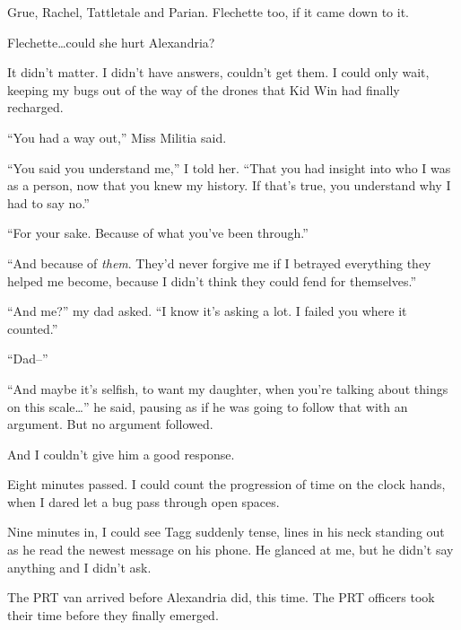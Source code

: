 Grue, Rachel, Tattletale and Parian.  Flechette too, if it came down to it.



Flechette\ldots could she hurt Alexandria?



It didn't matter.  I didn't have answers, couldn't get them.  I could only wait, keeping my bugs out of the way of the drones that Kid Win had finally recharged.



``You had a way out,'' Miss Militia said.



``You said you understand me,'' I told her.  ``That you had insight into who I was as a person, now that you knew my history.  If that's true, you understand why I had to say no.''



``For your sake.  Because of what you've been through.''



``And because of \emph{them}.  They'd never forgive me if I betrayed everything they helped me become, because I didn't think they could fend for themselves.''



``And me?'' my dad asked.  ``I know it's asking a lot.  I failed you where it counted.''



``Dad--''



``And maybe it's selfish, to want my daughter, when you're talking about things on this scale\ldots'' he said, pausing as if he was going to follow that with an argument.  But no argument followed.



And I couldn't give him a good response.



Eight minutes passed.  I could count the progression of time on the clock hands, when I dared let a bug pass through open spaces.



Nine minutes in, I could see Tagg suddenly tense, lines in his neck standing out as he read the newest message on his phone.  He glanced at me, but he didn't say anything and I didn't ask.



The PRT van arrived before Alexandria did, this time.  The PRT officers took their time before they finally emerged.



